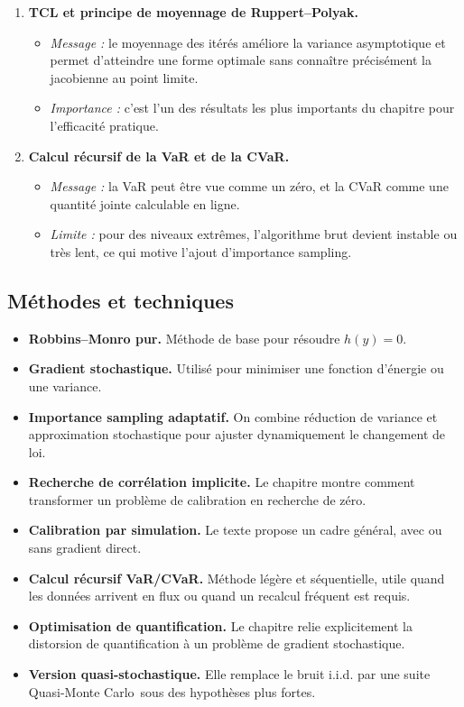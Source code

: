 \documentclass[11pt,a4paper]{article}
\newcommand{\qmc}{Quasi-Monte Carlo}
\begin{document}
\begin{enumerate}[label=\textbf{\arabic*.}]
  \item \textbf{TCL et principe de moyennage de Ruppert--Polyak.}
  \begin{itemize}
    \item \emph{Message :} le moyennage des itérés améliore la variance asymptotique et permet d'atteindre une forme optimale sans connaître précisément la jacobienne au point limite.
    \item \emph{Importance :} c'est l'un des résultats les plus importants du chapitre pour l'efficacité pratique.
  \end{itemize}

  \item \textbf{Calcul récursif de la VaR et de la CVaR.}
  \begin{itemize}
    \item \emph{Message :} la VaR peut être vue comme un zéro, et la CVaR comme une quantité jointe calculable en ligne.
    \item \emph{Limite :} pour des niveaux extrêmes, l'algorithme brut devient instable ou très lent, ce qui motive l'ajout d'importance sampling.
  \end{itemize}
\end{enumerate}

\subsection{Méthodes et techniques}

\begin{itemize}
  \item \textbf{Robbins--Monro pur.} Méthode de base pour résoudre $h(y)=0$.
  \item \textbf{Gradient stochastique.} Utilisé pour minimiser une fonction d'énergie ou une variance.
  \item \textbf{Importance sampling adaptatif.} On combine réduction de variance et approximation stochastique pour ajuster dynamiquement le changement de loi.
  \item \textbf{Recherche de corrélation implicite.} Le chapitre montre comment transformer un problème de calibration en recherche de zéro.
  \item \textbf{Calibration par simulation.} Le texte propose un cadre général, avec ou sans gradient direct.
  \item \textbf{Calcul récursif VaR/CVaR.} Méthode légère et séquentielle, utile quand les données arrivent en flux ou quand un recalcul fréquent est requis.
  \item \textbf{Optimisation de quantification.} Le chapitre relie explicitement la distorsion de quantification à un problème de gradient stochastique.
  \item \textbf{Version quasi-stochastique.} Elle remplace le bruit i.i.d. par une suite \qmc\ sous des hypothèses plus fortes.
\end{itemize}
\end{document}
